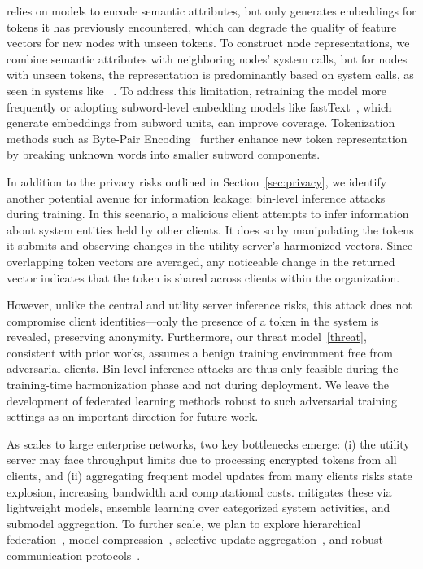  \Sys relies on \wordvec models to encode semantic attributes, but \wordvec only generates embeddings for tokens it has previously encountered, which can degrade the quality of feature vectors for new nodes with unseen tokens. To construct node representations, we combine semantic attributes with neighboring nodes' system calls, but for nodes with unseen tokens, the representation is predominantly based on system calls, as seen in systems like \threatrace~\cite{wang2022threatrace}. To address this limitation, retraining the \wordvec model more frequently or adopting subword-level embedding models like fastText~\cite{joulin2016bag}, which generate embeddings from subword units, can improve coverage. Tokenization methods such as Byte-Pair Encoding~\cite{araabi2022effective} further enhance new token representation by breaking unknown words into smaller subword components.


In addition to the privacy risks outlined in Section~\ref{sec:privacy}, we identify another potential avenue for information leakage: bin-level inference attacks during training. In this scenario, a malicious client attempts to infer information about system entities held by other clients. It does so by manipulating the tokens it submits and observing changes in the utility server's harmonized vectors. Since overlapping token vectors are averaged, any noticeable change in the returned vector indicates that the token is shared across clients within the organization.  

However, unlike the central and utility server inference risks, this attack does not compromise client identities—only the presence of a token in the system is revealed, preserving anonymity. Furthermore, our threat model~\ref{threat}, consistent with prior \pids works, assumes a benign training environment free from adversarial clients. Bin-level inference attacks are thus only feasible during the training-time harmonization phase and not during deployment. We leave the development of federated learning methods robust to such adversarial training settings as an important direction for future work.

As \Sys scales to large enterprise networks, two key bottlenecks emerge: (i) the utility server may face throughput limits due to processing encrypted tokens from all clients, and (ii) aggregating frequent model updates from many clients risks state explosion, increasing bandwidth and computational costs. \Sys mitigates these via lightweight models, ensemble learning over categorized system activities, and submodel aggregation. To further scale, we plan to explore hierarchical federation~\cite{zhong2022flee}, model compression~\cite{choudhary2020comprehensive}, selective update aggregation~\cite{ye2020federated}, and robust communication protocols~\cite{laclau2020robust}.


